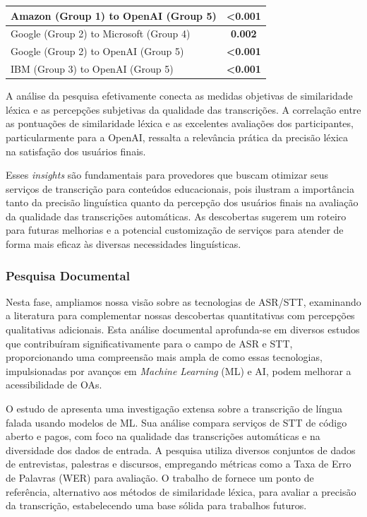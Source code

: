 \begin{table}[htb]
\begin{tabular}{|lcccc|}
\multicolumn{3}{|l|}{Amazon (Group 1) to OpenAI (Group 5)} & \multicolumn{2}{c|}{\textbf{\textless 0.001}} \\ \hline
\multicolumn{3}{|l|}{Google (Group 2) to Microsoft (Group 4)} & \multicolumn{2}{c|}{\textbf{0.002}} \\ \hline
\multicolumn{3}{|l|}{Google (Group 2) to OpenAI (Group 5)} & \multicolumn{2}{c|}{\textbf{\textless 0.001}} \\ \hline
\multicolumn{3}{|l|}{IBM (Group 3) to OpenAI (Group 5)} & \multicolumn{2}{c|}{\textbf{\textless 0.001}} \\ \hline
\end{tabular}
\end{table}

A análise da pesquisa efetivamente conecta as medidas objetivas de similaridade léxica e as percepções subjetivas da qualidade das transcrições. A correlação entre as pontuações de similaridade léxica e as excelentes avaliações dos participantes, particularmente para a OpenAI, ressalta a relevância prática da precisão léxica na satisfação dos usuários finais. 

Esses \textit{insights} são fundamentais para provedores que buscam otimizar seus serviços de transcrição para conteúdos educacionais, pois ilustram a importância tanto da precisão linguística quanto da percepção dos usuários finais na avaliação da qualidade das transcrições automáticas. As descobertas sugerem um roteiro para futuras melhorias e a potencial customização de serviços para atender de forma mais eficaz às diversas necessidades linguísticas.

\subsubsection{Pesquisa Documental}

Nesta fase, ampliamos nossa visão sobre as tecnologias de ASR/STT, examinando a literatura para complementar nossas descobertas quantitativas com percepções qualitativas adicionais. Esta análise documental aprofunda-se em diversos estudos que contribuíram significativamente para o campo de ASR e STT, proporcionando uma compreensão mais ampla de como essas tecnologias, impulsionadas por avanços em \textit{Machine Learning} (ML) e AI, podem melhorar a acessibilidade de OAs.

O estudo de  apresenta uma investigação extensa sobre a transcrição de língua falada usando modelos de ML. Sua análise compara serviços de STT de código aberto e pagos, com foco na qualidade das transcrições automáticas e na diversidade dos dados de entrada. A pesquisa utiliza diversos conjuntos de dados de entrevistas, palestras e discursos, empregando métricas como a Taxa de Erro de Palavras (WER) para avaliação. O trabalho de  fornece um ponto de referência, alternativo aos métodos de similaridade léxica, para avaliar a precisão da transcrição, estabelecendo uma base sólida para trabalhos futuros.

